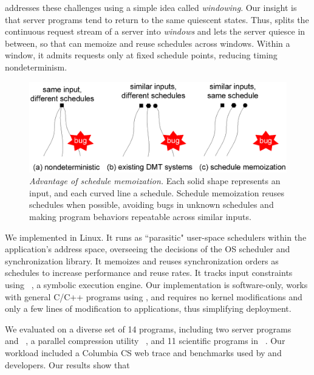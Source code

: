 \tern addresses these challenges using a simple idea called
\emph{windowing}.  Our insight is that server programs tend to return to the
same quiescent states. Thus, \tern splits the continuous request stream of a
server into \emph{windows} and lets the server quiesce in between, so that \tern
can memoize and reuse schedules across windows.  Within a window, it admits
requests only at fixed schedule points, reducing timing nondeterminism.

\begin{figure}[t]
\centering
\includegraphics[width=.5\textwidth]{tern/figures/idea.eps}
\caption{\small{\em Advantage of schedule memoization.}  Each solid shape
  represents an input, and each curved line a schedule.  Schedule
  memoization reuses schedules when possible, avoiding bugs in unknown
  schedules and making program behaviors repeatable across similar
  inputs.}
\label{fig:tern-idea}
\end{figure}%


We implemented \tern in Linux.  It runs as ``parasitic"
user-space schedulers within the application's address space, overseeing
the decisions of the OS scheduler and synchronization library.  It
memoizes and reuses synchronization orders as schedules to increase
performance and reuse rates. It tracks input constraints using
\klee~\cite{klee:osdi08}, a symbolic execution engine.  Our implementation
is software-only, works with general C/C++ programs using \pthread, and
requires no kernel modifications and only a few lines of modification to
applications, thus simplifying deployment.

We evaluated \tern on a diverse set of 14 programs, including two server
programs \apache~\cite{apache} and \mysql~\cite{mysql}, a parallel
compression utility \pbzip~\cite{pbzip2}, and 11 scientific programs in
\splash~\cite{splash2}.  Our workload included a Columbia CS web trace and
benchmarks used by \apache and \mysql developers.  Our results show that

